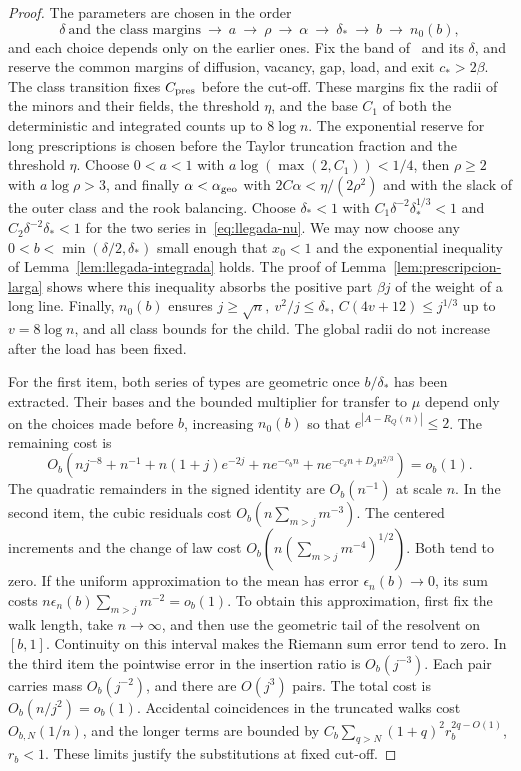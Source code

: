 \begin{proof}
The parameters are chosen in the order
\[
 \delta\ \text{and the class margins}\ \longrightarrow\ a\ \longrightarrow\ \rho\ \longrightarrow\
 \alpha\ \longrightarrow\ \delta_*\ \longrightarrow\ b\ \longrightarrow\ n_0(b),
\]
and each choice depends only on the earlier ones.
Fix the band of~\cite[§5.4]{tc} and its \(\delta\), and reserve the common margins of diffusion,
vacancy, gap, load, and exit \(c_*>2\beta\). The class transition fixes \(C_{\rm pres}\) before the
cut-off. These margins fix the radii of the minors and their fields, the threshold \(\eta\), and the base
\(C_1\) of both the deterministic and integrated counts up to \(8\log n\). The exponential reserve for
long prescriptions is chosen before the Taylor truncation fraction and the threshold \(\eta\). Choose
\(0<a<1\) with \(a\log(\max(2,C_1))<1/4\), then \(\rho\ge2\) with \(a\log\rho>3\), and finally
\(\alpha<\alpha_{\rm geo}\) with \(2C\alpha<\eta/(2\rho^2)\) and with the slack of the outer class and
the rook balancing. Choose \(\delta_*<1\) with \(C_1\delta^{-2}\delta_*^{1/3}<1\) and
\(C_2\delta^{-2}\delta_*<1\) for the two series in~\eqref{eq:llegada-nu}. We may now choose any
\(0<b<\min(\delta/2,\delta_*)\) small enough that \(x_0<1\) and the exponential inequality of
Lemma~\ref{lem:llegada-integrada} holds. The proof of Lemma~\ref{lem:prescripcion-larga} shows where this
inequality absorbs the positive part \(\beta j\) of the weight of a long line. Finally, \(n_0(b)\)
ensures \(j\ge\sqrt n,\ v^2/j\le\delta_*\), \(C(4v+12)\le j^{1/3}\) up to \(v=8\log n\), and all class
bounds for the child. The global radii do not increase after the load has been fixed.

For the first item, both series of types are geometric once \(b/\delta_*\) has been extracted. Their
bases and the bounded multiplier for transfer to \(\mu\) depend only on the choices made before \(b\),
increasing \(n_0(b)\) so that \(e^{|A-R_Q(n)|}\le2\). The remaining cost is
\[
 O_b\!\left(nj^{-8}+n^{-1}+n(1+j)e^{-2j}+ne^{-c_b n}
           +n e^{-c_\delta n+D_\delta n^{2/3}}\right)=o_b(1).
\]
The quadratic remainders in the signed identity are \(O_b(n^{-1})\) at scale \(n\). In the second item,
the cubic residuals cost \(O_b(n\sum_{m>j}m^{-3})\). The centered increments and the change of law cost
\(O_b(n(\sum_{m>j}m^{-4})^{1/2})\). Both tend to zero. If the uniform approximation to the mean has error
\(\epsilon_n(b)\to0\), its sum costs \(n\epsilon_n(b)\sum_{m>j}m^{-2}=o_b(1)\). To obtain this
approximation, first fix the walk length, take \(n\to\infty\), and then use the geometric tail of the
resolvent on \([b,1]\). Continuity on this interval makes the Riemann sum error tend to zero. In the
third item the pointwise error in the insertion ratio is \(O_b(j^{-3})\). Each pair carries mass
\(O_b(j^{-2})\), and there are \(O(j^3)\) pairs. The total cost is \(O_b(n/j^2)=o_b(1)\). Accidental
coincidences in the truncated walks cost \(O_{b,N}(1/n)\), and the longer terms are bounded by
\(C_b\sum_{q>N}(1+q)^2r_b^{2q-O(1)}\), \(r_b<1\). These limits justify the substitutions at fixed cut-off.
\end{proof}
